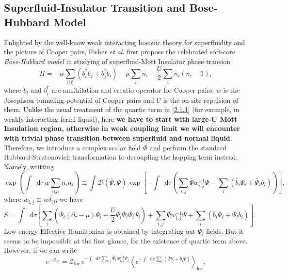 \documentclass[10pt,nofootinbib]{revtex4}
\newcommand*\dd{\mathop{}\!\mathrm{d}}
\def\Z{\mathcal{Z}}
\numberwithin{equation}{section}
\begin{document}
	\subsection{Superfluid-Insulator Transition and Bose-Hubbard Model}
		Enlighted by the well-know weak interacting bosonic theory for superfluidity and the picture of Cooper pairs, Fisher \textit{et al.} first propose the celebrated soft-core \emph{Bose-Hubbard model} in studying of superfluid-Mott Insulator phase transion \cite{fisher1989boson}
		\begin{equation}\label{2.1.1}
			H=-w\sum_{\langle ij\rangle }(b_i^\dagger b_j+b_j^\dagger b_i)-\mu\sum_{i}n_i+\dfrac{U}{2}\sum_{i}n_i(n_i-1),
		\end{equation}
		where $b_i$ and $b_i^\dagger$ are annihilation and creatio operator for Cooper pairs, $w$ is the Josephson tunneling potential of Cooper pairs and $U$ is the on-site repulsion of them. Unlike the usual treatment of the quartic term in \eqref{2.1.1} (for example, in weakly-interacting fermi liquid), here \textbf{we have to start with large-U Mott Insulation region, otherwise in weak coupling limit we will encounter with trivial phase transition between superfluid and normal liquid}. Therefore, we introduce a complex scalar field $\Phi$ and perform the standard Hubbard-Stratonovich transformation to decoupling the hopping term instead. Namely, writting
		\begin{equation*}
			\exp\left(\int\dd\tau\,w\sum_{\langle ij\rangle}n_in_i\right)\equiv\int\mathcal{D}(\bar{\Psi},\Psi)\,\exp\left[-\int\dd\tau\left(\sum_{i,j}\bar{\Psi}w_{i,j}^{-1}\Psi-\sum_{i}(\bar{b}_i\Psi_i+\bar{\Psi}_ib_i)\right)\right],
		\end{equation*}
		where $w_{i,j}\equiv w\delta_{ij}$, we have
		\begin{equation*}
			S=\int\dd\tau\left[\sum_i \left(\bar{\Psi}_i(\partial_\tau-\mu)\Psi_i+\dfrac{U}{2}\bar{\Psi}_i\bar{\Psi}_i\Psi_i\Psi_i\right)+\sum_{i,j}\bar{\Psi}w_{i,j}^{-1}\Psi+\sum_{i}(\bar{b}_i\Psi_i+\bar{\Psi}_ib_i)\right].
		\end{equation*}
		Low-energy Effective Hamiltonian is obtained by integrating out $\Psi_i$ fields. But it seems to be impossible at the first glance, for the existence of quartic term above. However, if we can write
		\begin{equation}\label{2.1.2}
			e^{-S_{\text{eff}}}=\Z_{\text{loc}}\,e^{-\int\dd\tau\,\sum_{i,j}\bar{\Psi}_iw_{i,j}^{-1}\Psi_j}\left\langle e^{-\int\dd\tau\,\sum_i(\bar{\Psi}b_i+\bar{b}_i\Psi)}\right\rangle_{\text{loc}},
		\end{equation}
\end{document}
